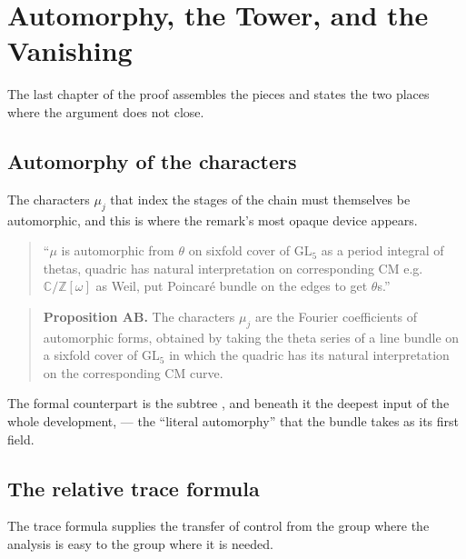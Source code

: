 
\chapter{Automorphy, the Tower, and the Vanishing}
\label{ch:assembly}

The last chapter of the proof assembles the pieces and states the two places
where the argument does not close.

\section{Automorphy of the characters}The characters $\mu_j$ that index the stages of the chain must themselves be
automorphic, and this is where the remark's most opaque device appears.

\begin{quote}
\small
``$\mu$ is automorphic from $\theta$ on sixfold cover of $\mathrm{GL}_5$ as a
period integral of thetas, quadric has natural interpretation on corresponding
CM e.g.\ $\mathbb{C}/\mathbb{Z}[\omega]$ as Weil, put Poincar\'e bundle on the
edges to get $\theta$s.''
\end{quote}

\begin{quote}
\textbf{Proposition AB.} The characters $\mu_j$ are the Fourier coefficients
of automorphic forms, obtained by taking the theta series of a line bundle on a
sixfold cover of $\mathrm{GL}_5$ in which the quadric has its natural
interpretation on the corresponding CM curve.
\end{quote}

The formal counterpart is the subtree
,
and beneath it the deepest input of the whole development,
 --- the ``literal
automorphy'' that the bundle  takes as its first field.

\section{The relative trace formula}The trace formula supplies the transfer of control from the group where the
analysis is easy to the group where it is needed.

